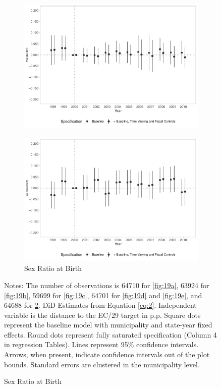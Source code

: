 \begin{figure}[h!]
\begin{center}
\begin{subfigure}{0.32\textwidth}
        \includegraphics[width=\textwidth]{plots/birth_premature_dist_ec29_baseline_dist_ec29_baseline_19.pdf}
    \end{subfigure}
    \begin{subfigure}{0.32\textwidth}
        \centering
        \caption{\scriptsize Sex Ratio at Birth}\label{fig:19f}
        \includegraphics[width=\textwidth]{plots/birth_sexratio_dist_ec29_baseline_dist_ec29_baseline_19.pdf}
    \end{subfigure}
    
    \end{center}
    
            \scriptsize{Notes: The number of observations is 64710 for \ref{fig:19a}, 63924 for \ref{fig:19b}, 59699 for \ref{fig:19c}, 64701 for \ref{fig:19d} and \ref{fig:19e}, and 64688 for \ref{fig:19f}. DiD Estimates from Equation \ref{eq:2}. Independent variable is the distance to the EC/29 target in p.p. Square dots represent the baseline model with municipality and state-year fixed effects. Round dots represent fully saturated specification (Column 4 in regression Tables). Lines represent 95\% confidence intervals. Arrows, when present, indicate confidence intervals out of the plot bounds. Standard errors are clustered in the municipality level.}
    
\end{figure}